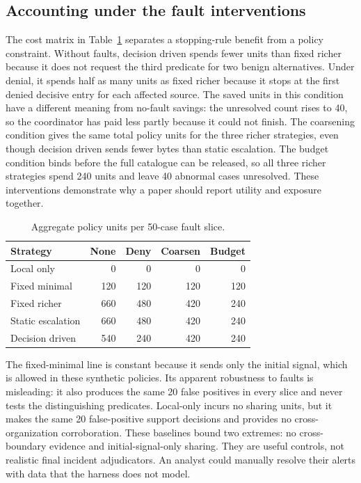 \subsection{Accounting under the fault interventions}
The cost matrix in Table~\ref{tab:units} separates a stopping-rule benefit from a policy constraint. Without faults, decision driven spends fewer units than fixed richer because it does not request the third predicate for two benign alternatives. Under denial, it spends half as many units as fixed richer because it stops at the first denied decisive entry for each affected source. The saved units in this condition have a different meaning from no-fault savings: the unresolved count rises to 40, so the coordinator has paid less partly because it could not finish. The coarsening condition gives the same total policy units for the three richer strategies, even though decision driven sends fewer bytes than static escalation. The budget condition binds before the full catalogue can be released, so all three richer strategies spend 240 units and leave 40 abnormal cases unresolved. These interventions demonstrate why a paper should report utility and exposure together.

\begin{table}[t]
\centering\caption{Aggregate policy units per 50-case fault slice.}
\label{tab:units}\scriptsize
\begin{tabular}{lrrrr}\hline
Strategy & None & Deny & Coarsen & Budget \\\hline
Local only &0&0&0&0\\
Fixed minimal &120&120&120&120\\
Fixed richer &660&480&420&240\\
Static escalation &660&480&420&240\\
Decision driven &540&240&420&240\\\hline
\end{tabular}
\end{table}

The fixed-minimal line is constant because it sends only the initial signal, which is allowed in these synthetic policies. Its apparent robustness to faults is misleading: it also produces the same 20 false positives in every slice and never tests the distinguishing predicates. Local-only incurs no sharing units, but it makes the same 20 false-positive support decisions and provides no cross-organization corroboration. These baselines bound two extremes: no cross-boundary evidence and initial-signal-only sharing. They are useful controls, not realistic final incident adjudicators. An analyst could manually resolve their alerts with data that the harness does not model.

